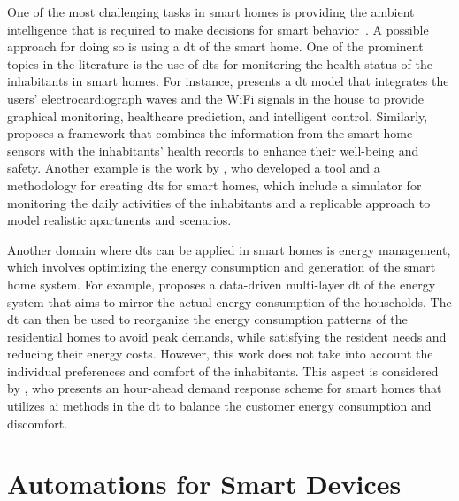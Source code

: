 One of the most challenging tasks in smart homes is providing the ambient intelligence that
is required to make decisions for smart behavior~\parencite{desilvaStateArtSmart2012}. A possible approach for doing so is using a \acrfull{dt} of the smart home. One of the prominent topics in the literature is the use of \acrshort{dt}s for monitoring the health status of the inhabitants in smart homes. For instance, \textcite{chenDigitalTwinEmpowered2023} presents a \acrshort{dt} model that integrates the users' electrocardiograph waves and the WiFi signals in the house to provide graphical monitoring, healthcare prediction, and intelligent control. Similarly, \textcite{shoukatSmartHomeEnhanced2023} proposes a framework that combines the information from the smart home sensors with the inhabitants' health records to enhance their well-being and safety. Another example is the work by \textcite{bouchabouSmartHomeDigital2023}, who developed a tool and a methodology for creating \acrshort{dt}s for smart homes, which include a simulator for monitoring the daily activities of the inhabitants and a replicable approach to model realistic apartments and scenarios.

Another domain where \acrshort{dt}s can be applied in smart homes is energy management, which involves optimizing the energy consumption and generation of the smart home system. For example, \textcite{fathyDigitalTwinDrivenDecision2021} proposes a data-driven multi-layer \acrshort{dt} of the energy system that aims to mirror the actual energy consumption of the households. The \acrshort{dt} can then be used to reorganize the energy consumption patterns of the residential homes to avoid peak demands, while satisfying the resident needs and reducing their energy costs. However, this work does not take into account the individual preferences and comfort of the inhabitants. This aspect is considered by \textcite{huangMachineLearningbasedDemand2023}, who presents an hour-ahead demand response scheme for smart homes that utilizes \acrshort{ai} methods in the \acrshort{dt} to balance the customer energy consumption and discomfort.

\section{Automations for Smart Devices}

